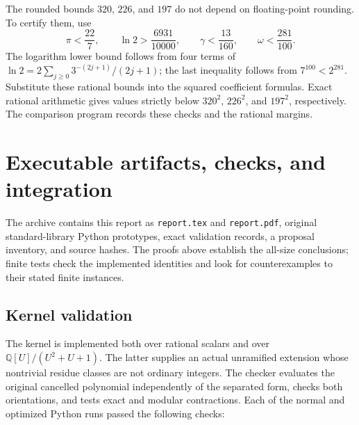 \documentclass[11pt,letterpaper]{article}
\theoremstyle{definition}\newtheorem{definition}[theorem]{Definition}
\theoremstyle{remark}\newtheorem{remark}[theorem]{Remark}
\begin{document}
The rounded bounds $320$, $226$, and $197$ do not depend on floating-point
rounding. To certify them, use
\[
 \pi<\frac{22}{7},\qquad \ln2>\frac{6931}{10000},\qquad
 \gamma<\frac{13}{160},\qquad \omega<\frac{281}{100}.
\]
The logarithm lower bound follows from four terms of
$\ln2=2\sum_{j\ge0}3^{-(2j+1)}/(2j+1)$; the last inequality follows
from $7^{100}<2^{281}$. Substitute these rational bounds into the squared
coefficient formulas. Exact rational arithmetic gives values strictly below
$320^2$, $226^2$, and $197^2$, respectively. The comparison program records
these checks and the rational margins.

\section{Executable artifacts, checks, and integration}
\label{sec:verification}

The archive contains this report as \texttt{report.tex} and
\texttt{report.pdf}, original standard-library Python prototypes, exact
validation records, a proposal inventory, and source hashes. The proofs
above establish the all-size conclusions; finite tests check the implemented
identities and look for counterexamples to their stated finite instances.

\subsection{Kernel validation}

The kernel is implemented both over rational scalars and over
$\mathbb Q[U]/(U^2+U+1)$. The latter supplies an actual unramified extension
whose nontrivial residue classes are not ordinary integers. The checker
evaluates the original cancelled polynomial independently of the separated
form, checks both orientations, and tests exact and modular contractions.
Each of the normal and optimized Python runs passed the following checks:
\end{document}
